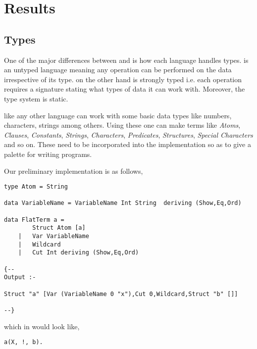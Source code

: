 \documentclass[thesis-solanki.tex]{subfiles}
\begin{document}
\chapter{Results}\label{sect:results}

\section{Types}


One of the major differences between  and  is how each language handles types.  is an 
untyped language meaning any operation can be performed on the data irrespective of its type.  on the other hand is 
strongly typed i.e. each operation requires a signature stating what types of data it can work with. Moreover, the  type 
system is static. 


 like any other language can work with some basic data types like numbers, characters, strings among others. Using these  
one can make terms like \textit{Atoms}, \textit{Clauses}, \textit{Constants}, \textit{Strings}, \textit{Characters}, \textit{Predicates}, 
\textit{Structures}, \textit{Special Characters} and so on. These need to be incorporated into the implementation so as to give a palette
for writing programs. 

Our preliminary implementation is as follows,
\begin{verbatim}
type Atom = String

data VariableName = VariableName Int String  deriving (Show,Eq,Ord)

data FlatTerm a = 
		Struct Atom [a]
	| 	Var VariableName
	|	Wildcard
	|	Cut Int deriving (Show,Eq,Ord)

{--
Output :-

Struct "a" [Var (VariableName 0 "x"),Cut 0,Wildcard,Struct "b" []]

--}
\end{verbatim}
        
which in  would look like,

\begin{verbatim}
a(X, !, b).
\end{verbatim}





\end{document}
